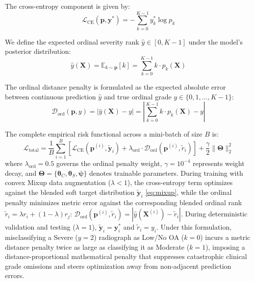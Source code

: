 \documentclass[10pt,journal]{IEEEtran}
\begin{document}
The cross-entropy component is given by:
\begin{equation}
\mathcal{L}_{\text{CE}}(\mathbf{p}, \mathbf{y}^*) = -\sum_{k=0}^{K-1} y_k^* \log p_k
\label{eq:ce_loss}
\end{equation}

We define the expected ordinal severity rank $\hat{y} \in [0, K-1]$ under the model's posterior distribution:
\begin{equation}
\hat{y}(\mathbf{X}) = \mathbb{E}_{k \sim \mathbf{p}}[k] = \sum_{k=0}^{K-1} k \cdot p_k(\mathbf{X})
\label{eq:expected_rank}
\end{equation}

The ordinal distance penalty is formulated as the expected absolute error between continuous prediction $\hat{y}$ and true ordinal grade $y \in \{0, 1, \dots, K-1\}$:
\begin{equation}
\mathcal{D}_{\text{ord}}(\mathbf{p}, y) = |\hat{y}(\mathbf{X}) - y| = \left| \sum_{k=0}^{K-1} k \cdot p_k(\mathbf{X}) - y \right|
\label{eq:mae_loss}
\end{equation}

The complete empirical risk functional across a mini-batch of size $B$ is:
\begin{equation}
\mathcal{L}_{\text{total}} = \frac{1}{B}\sum_{i=1}^B \left[ \mathcal{L}_{\text{CE}}(\mathbf{p}^{(i)}, \tilde{\mathbf{y}}_i) + \lambda_{\text{ord}} \cdot \mathcal{D}_{\text{ord}}(\mathbf{p}^{(i)}, \tilde{r}_i) \right] + \frac{\gamma}{2}\|\bm{\Theta}\|_2^2
\label{eq:total_loss}
\end{equation}
where $\lambda_{\text{ord}} = 0.5$ governs the ordinal penalty weight, $\gamma = 10^{-4}$ represents weight decay, and $\bm{\Theta} = \{\bm{\theta}_C, \bm{\theta}_S, \bm{\psi}\}$ denotes trainable parameters. During training with convex Mixup data augmentation ($\lambda < 1$), the cross-entropy term optimizes against the blended soft target distribution $\tilde{\mathbf{y}}_i$ \eqref{eq:mixup}, while the ordinal penalty minimizes metric error against the corresponding blended ordinal rank $\tilde{r}_i = \lambda r_i + (1 - \lambda)r_j$: $\mathcal{D}_{\text{ord}}(\mathbf{p}^{(i)}, \tilde{r}_i) = |\hat{y}(\mathbf{X}^{(i)}) - \tilde{r}_i|$. During deterministic validation and testing ($\lambda = 1$), $\tilde{\mathbf{y}}_i = \mathbf{y}_i^*$ and $\tilde{r}_i = y_i$. Under this formulation, misclassifying a Severe ($y=2$) radiograph as Low/No OA ($k=0$) incurs a metric distance penalty twice as large as classifying it as Moderate ($k=1$), imposing a distance-proportional mathematical penalty that suppresses catastrophic clinical grade omissions and steers optimization away from non-adjacent prediction errors.
\end{document}

